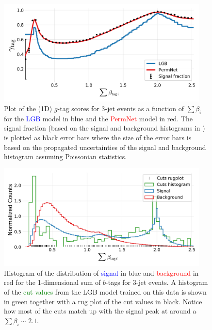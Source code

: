 \begin{figure}
  \includegraphics[width=0.95\textwidth, trim=10 10 10 10, clip]{figures/quarks/gtag_sum_models_njet=3-down_sample=1.00-ML_vars=vertex-selection=b-ejet_min=4-n_iter_RS_lgb=99-n_iter_RS_xgb=9-cdot_cut=0.90-version=19.pdf}
  \vspace{-0.7cm}
  \caption[1D Sum Models Predictions and Signal Fraction for 3-jets events]
          {Plot of the (1D) $g$-tag scores for 3-jet events as a function of $\sum \beta_i$ for the \textcolor{blue}{LGB} model in blue and the \textcolor{red}{PermNet} model in red. The signal fraction (based on the signal and background histograms in ) is plotted as black error bars where the size of the error bars is based on the propagated uncertainties of the signal and background histogram assuming Poissonian statistics. } 
  \label{fig:q:1d_sum_models_signal_fraction_3j}
\end{figure}
\vspace{4cm}
\begin{figure}
  \includegraphics[width=0.95\textwidth, trim=10 10 10 20, clip]{figures/quarks/gtag_sum_method_njet=3-down_sample=1.00-ML_vars=vertex-selection=b-ejet_min=4-n_iter_RS_lgb=99-n_iter_RS_xgb=9-cdot_cut=0.90-version=19.pdf}
  \vspace{-0.7cm}
  \caption[1D LGB Model Cuts for 3-jets events]
          {Histogram of the distribution of \textcolor{blue}{signal} in blue and \textcolor{red}{background} in red for the 1-dimensional sum of $b$-tags for 3-jet events. A histogram of the \textcolor{green}{cut values} from the LGB model trained on this data is shown in green together with a rug plot of the cut values in black. Notice how most of the cuts match up with the signal peak at around a $\sum \beta_i \sim 2.1$.
          } 
  \label{fig:q:1d_sum_model_cuts_3j}
\end{figure}
\clearpage



